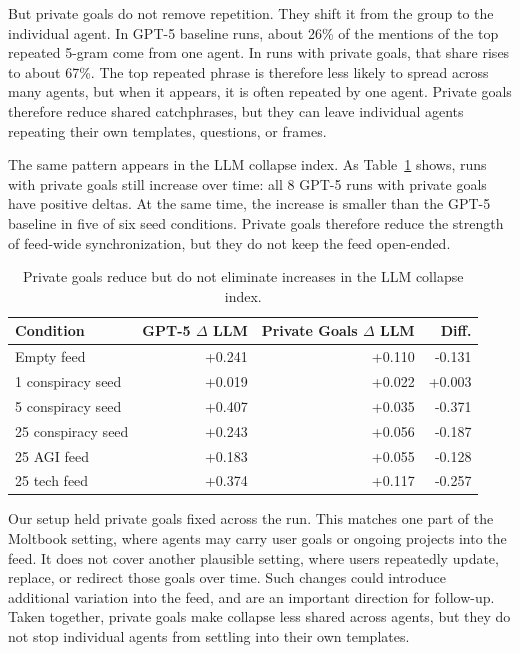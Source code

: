 \documentclass[11pt]{article}
\begin{document}
But private goals do not remove repetition. They shift it from the group to the individual agent. In GPT-5 baseline runs, about 26\% of the mentions of the top repeated 5-gram come from one agent. In runs with private goals, that share rises to about 67\%. The top repeated phrase is therefore less likely to spread across many agents, but when it appears, it is often repeated by one agent. Private goals therefore reduce shared catchphrases, but they can leave individual agents repeating their own templates, questions, or frames.

The same pattern appears in the LLM collapse index. As Table~\ref{tab:private-goals} shows, runs with private goals still increase over time: all 8 GPT-5 runs with private goals have positive deltas. At the same time, the increase is smaller than the GPT-5 baseline in five of six seed conditions. Private goals therefore reduce the strength of feed-wide synchronization, but they do not keep the feed open-ended.

\begin{table}[t]
\centering
\caption{Private goals reduce but do not eliminate increases in the LLM collapse index.}
\label{tab:private-goals}
\scriptsize
\setlength{\tabcolsep}{3pt}
\begin{tabular}{@{}lrrr@{}}
\toprule
Condition & GPT-5 $\Delta$ LLM & Private Goals $\Delta$ LLM & Diff. \\
\midrule
Empty feed & +0.241 & +0.110 & -0.131 \\
1 conspiracy seed & +0.019 & +0.022 & +0.003 \\
5 conspiracy seed & +0.407 & +0.035 & -0.371 \\
25 conspiracy seed & +0.243 & +0.056 & -0.187 \\
25 AGI feed & +0.183 & +0.055 & -0.128 \\
25 tech feed & +0.374 & +0.117 & -0.257 \\
\bottomrule
\end{tabular}
\end{table}

Our setup held private goals fixed across the run. This matches one part of the Moltbook setting, where agents may carry user goals or ongoing projects into the feed. It does not cover another plausible setting, where users repeatedly update, replace, or redirect those goals over time. Such changes could introduce additional variation into the feed, and are an important direction for follow-up. Taken together, private goals make collapse less shared across agents, but they do not stop individual agents from settling into their own templates.
\end{document}

